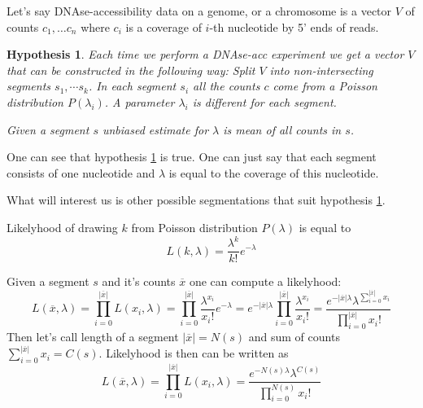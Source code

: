 \documentclass{article}
\newtheorem{hyp}{Hypothesis}
\begin{document}

Let's say DNAse-accessibility data on a genome, or a chromosome is a vector $V$ of counts $c_1, \dots c_n$
where $c_i$ is a coverage of $i$-th nucleotide by 5' ends of reads.
\begin{hyp}
    \label{hyp:main}
Each time we perform a DNAse-acc experiment we get a vector $V$ that can be constructed in the following way:
Split $V$ into non-intersecting segments $s_1, \cdots s_k$. In each segment $s_i$ all the counts $c$ come from a Poisson distribution
    $P(\lambda_i)$. A parameter $\lambda_i$ is different for each segment.
    
    Given a segment $s$ unbiased estimate for $\lambda$ is mean of all counts in $s$.
\end{hyp}
One can see that hypothesis \ref{hyp:main} is true. One can just say that each segment consists of one nucleotide
and $\lambda$ is equal to the coverage of this nucleotide. 

What will interest us is other possible segmentations that suit hypothesis \ref{hyp:main}.

Likelyhood of drawing $k$ from Poisson distribution $P(\lambda)$ is equal to 
$$
L(k, \lambda) = \frac {\lambda^k} {k!} e^{-\lambda}
$$

Given a segment $s$ and it's counts $\overline{x}$ one can compute a likelyhood:
$$
L(\overline{x}, \lambda) = \prod _{i=0} ^{|\overline{x}|} {L(x_i, \lambda)} = 
\prod _{i=0} ^{|\overline{x}|} \frac {\lambda^{x_i}} {x_i!} e^{-\lambda} = 
e^{-|\overline{x}|\lambda} \prod _{i=0} ^{|\overline{x}|} \frac {\lambda^{x_i}} {x_i!}  = 
\frac {e^{-|\overline{x}|\lambda} \lambda^{\sum _{i=0} ^{|\overline{x}|} x_i}} {\prod _{i=0} ^{|\overline{x}|} x_i!}
$$
Then let's call length of a segment $|\overline{x}| = N(s)$ and sum of counts $\sum _{i=0} ^{|\overline{x}|} x_i = C(s)$.
Likelyhood is then can be written as 
$$
L(\overline{x}, \lambda) = \prod _{i=0} ^{|\overline{x}|} {L(x_i, \lambda)} = 
\frac {e^{-N(s)\lambda} \lambda^{C(s)}} {\prod _{i=0} ^{N(s)} x_i!}
$$
\end{document}
